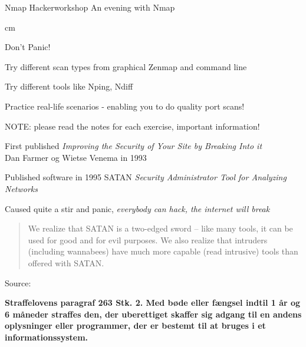 \documentclass[Screen16to9,17pt]{foils}
\begin{document}

\mytitlepage
{Nmap Hackerworkshop}
{An evening with Nmap}

\LogoOn



 cm

\centerline{\color{titlecolor}\LARGE Don't Panic!}

\begin{list1}
\item Try different scan types from graphical Zenmap and command line
\item Try different tools like Nping, Ndiff
\item Practice real-life scenarios - enabling you to do quality port scans!
\item NOTE: please read the notes for each exercise, important information!
\end{list1}



\begin{list1}
\item First published \emph{Improving the Security of Your Site by Breaking Into it}\\
Dan Farmer og Wietse Venema in 1993
\item Published software in 1995 SATAN
\emph{Security Administrator Tool for Analyzing Networks}
\item Caused quite a stir and panic, {\it everybody can hack, the internet will break}

\vskip 1cm
\begin{quote}
We realize that SATAN is a two-edged sword -- like
many tools, it can be used for good and for evil
purposes. We also realize that intruders (including
wannabees) have much more capable (read intrusive)
tools than offered with SATAN.
\end{quote}
\end{list1}

\vskip 1cm
Source:



{\bfseries Straffelovens paragraf 263 Stk. 2. Med bøde eller fængsel indtil 1 år og 6 måneder straffes den, der uberettiget skaffer sig adgang til en andens oplysninger eller programmer, der er bestemt til at bruges i et informationssystem. }
\end{document}
